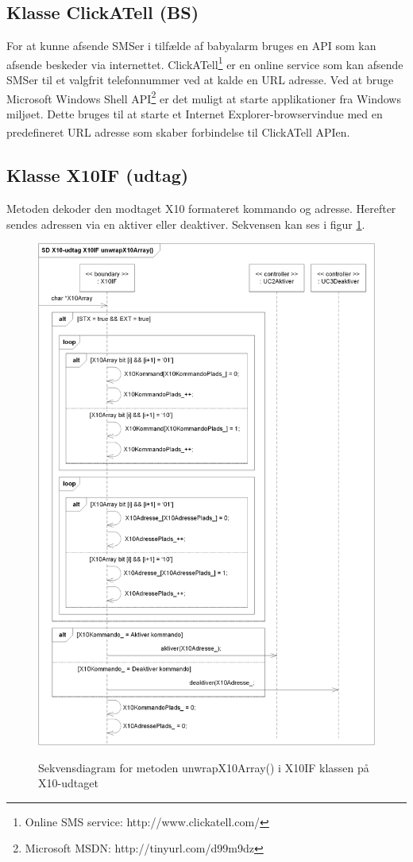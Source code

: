 \subsection{Klasse ClickATell (BS)}
For at kunne afsende SMSer i tilfælde af babyalarm bruges en API som kan afsende beskeder via internettet.
ClickATell\textsuperscript{\circledR}\footnote{Online SMS service: http://www.clickatell.com/} er en online service som kan afsende SMSer til et valgfrit telefonnummer ved at kalde en URL adresse.
Ved at bruge Microsoft Windows Shell API\footnote{Microsoft MSDN: http://tinyurl.com/d99m9dz} er det muligt at starte applikationer fra Windows miljøet. Dette bruges til at starte et Internet Explorer-browservindue med en predefineret URL adresse som skaber forbindelse til ClickATell\textsuperscript{\circledR} APIen. 

\subsection{Klasse X10IF (udtag)}
Metoden dekoder den modtaget X10 formateret kommando og adresse. Herefter sendes adressen via en aktiver eller deaktiver.
Sekvensen kan ses i figur \ref{fig:X10-Udtag_unwrapX10Array_SD}.

\begin{figure}[!htb]
     {\includegraphics[width=\textwidth]{billeder/uml/X10-Udtag_unwrapX10Array_SD}}
     \caption{Sekvensdiagram for metoden unwrapX10Array() i X10IF klassen på X10-udtaget}
     \label{fig:X10-Udtag_unwrapX10Array_SD}
\end{figure}
